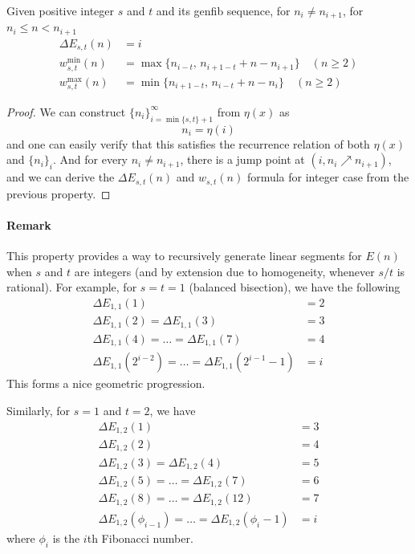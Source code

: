 \documentclass[]{article}
\begin{document}
\vspace{1cm}
\begin{lemma}[Fibonacci]
	Given positive integer $s$ and $t$ and its genfib sequence, for $n_i \neq n_{i+1}$, for $n_i \le n < n_{i+1}$
	\begin{align*}
	\Delta E_{s,t}(n) &= i\\
	w^{\min}_{s,t}(n) &= \max\{n_{i - t},\, n_{i +1 - t} + n - n_{i+1}\}\quad(n\geq 2)	\\
	w^{\max}_{s,t}(n) &= \min\{n_{i +1 - t},\,n_{i - t} + n - n_{i} \} \quad(n\geq 2)
	\end{align*}
\end{lemma}
\begin{proof}
	We can construct $\{n_i\}_{i=\min\{s,t\}+1}^{\infty}$ from $\eta(x)$ as
	\[
	n_i = \eta(i)
	\]
	and one can easily verify that this satisfies the recurrence relation of both $\eta(x)$ and $\{n_i\}_{i}$. And for every $n_i \neq n_{i+1}$, there is a jump point at $(i,n_i\nearrow n_{i+1})$, and we can derive the $\Delta E_{s,t}(n)$ and $w_{s,t}(n)$ formula for integer case from the previous property.

\end{proof}

\paragraph{Remark}

This property provides a way to recursively generate linear segments for $E(n)$ when $s$ and $t$ are integers (and by extension due to homogeneity, whenever $s/t$ is rational). For example, for $s = t = 1$ (balanced bisection), we have the following
\begin{align*}
\Delta E_{1,1}(1) &= 2 \\
\Delta E_{1,1}(2) = \Delta E_{1,1}(3) &= 3\\
\Delta E_{1,1}(4) =\dots = \Delta E_{1,1}(7) &= 4\\
\Delta E_{1,1}(2^{i-2}) =\dots = \Delta E_{1,1}(2^{i-1}-1) &= i
\end{align*}
This forms a nice geometric progression.

Similarly, for $s = 1$ and $t = 2$, we have
\begin{align*}
\Delta E_{1,2}(1) &= 3 \\
\Delta E_{1,2}(2) &= 4\\
\Delta E_{1,2}(3)  = \Delta E_{1,2}(4) &= 5\\
\Delta E_{1,2}(5) =\dots = \Delta E_{1,2}(7) &= 6\\
\Delta E_{1,2}(8) =\dots = \Delta E_{1,2}(12) &= 7\\
\Delta E_{1,2}(\phi_{i -1}) =\dots = \Delta E_{1,2}(\phi_{i} - 1) &= i
\end{align*}
where $\phi_i$ is the $i$th Fibonacci number.
\end{document}
